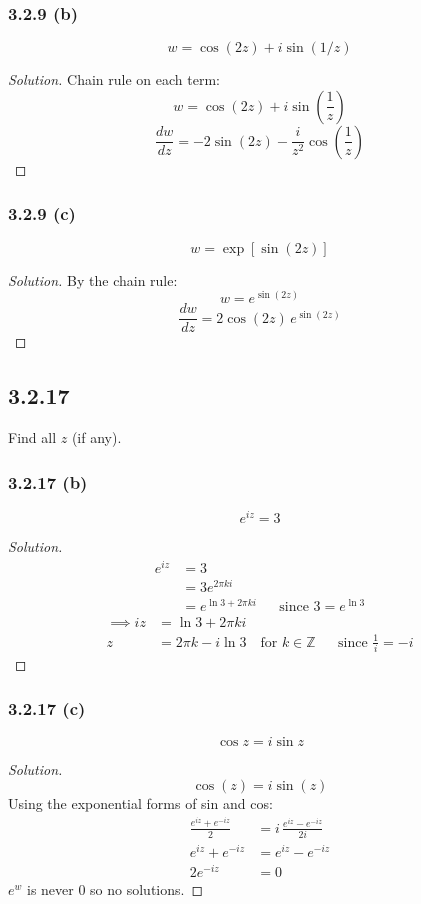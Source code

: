 \documentclass{article}
\newenvironment{solution}{
\begin{proof}[Solution]}{
\end{proof}}
\begin{document}
\subsubsection*{3.2.9 (b)}
\[ w = \cos(2z) + i \sin(1/z) \]
\begin{solution}
  Chain rule on each term:
  \[
    w=\cos(2z)+i\sin\left(\frac{1}{z}\right)
  \]
  \[
    \frac{dw}{dz}=-2\sin(2z)-\frac{i}{z^2}\cos\left(\frac{1}{z}\right)
  \]
\end{solution}

\subsubsection*{3.2.9 (c)}
\[ w = \exp[\sin(2z)] \]
\begin{solution}
  By the chain rule:
  \[
    w=e^{\sin(2z)}
  \]
  \[
    \frac{dw}{dz}=2\cos(2z)\,e^{\sin(2z)}
  \]
\end{solution}

\subsection*{3.2.17}
Find all $z$ (if any).

\subsubsection*{3.2.17 (b)}
\[ e^{iz} = 3 \]
\begin{solution}
  \begin{align*}
    e^{iz} & = 3 \\
    & = 3e^{2\pi ki} \\
    & = e^{\ln 3+2\pi ki} && \text{since } 3=e^{\ln 3}
  \end{align*}
  \begin{align*}
    \implies iz & = \ln 3+2\pi ki \\
    z & = 2\pi k-i\ln 3 \quad \text{for } k\in\mathbb{Z} && \text{since } \frac{1}{i}=-i
  \end{align*}
\end{solution}

\subsubsection*{3.2.17 (c)}
\[ \cos z = i \sin z \]
\begin{solution}
  \[
    \cos(z)=i\sin(z)
  \]
  Using the exponential forms of sin and cos:
  \begin{align*}
    \frac{e^{iz}+e^{-iz}}{2} & = i\,\frac{e^{iz}-e^{-iz}}{2i} \\
    e^{iz}+e^{-iz} & = e^{iz}-e^{-iz} \\
    2e^{-iz} & = 0
  \end{align*}
  $e^{w}$ is never 0 so no solutions.
\end{solution}
\end{document}
